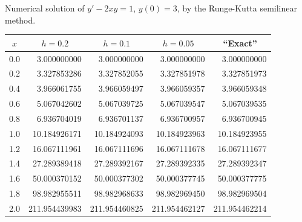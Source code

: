 \begin{examplesolution}
\begin{newtable}
  \label{table:3.3.4} Numerical solution of $y'-2xy=1$, $y(0)=3$, by the Runge-Kutta semilinear
  method.
  \begin{center}
    \begin{tabular}{|c|r|r|r|r|}
      \hline
      \multicolumn{1}{|c|}{$x$} & \multicolumn{1}{|c|}{$h=0.2$} & \multicolumn{1}{|c|}{$h=0.1$} & \multicolumn{1}{|c|}{$h=0.05$} & \multicolumn{1}{|c|}{``Exact''} \\
      \hline
      0.0                       & 3.000000000                   & 3.000000000                   & 3.000000000                    & 3.000000000                     \\
      0.2                       & 3.327853286                   & 3.327852055                   & 3.327851978                    & 3.327851973                     \\
      0.4                       & 3.966061755                   & 3.966059497                   & 3.966059357                    & 3.966059348                     \\
      0.6                       & 5.067042602                   & 5.067039725                   & 5.067039547                    & 5.067039535                     \\
      0.8                       & 6.936704019                   & 6.936701137                   & 6.936700957                    & 6.936700945                     \\
      1.0                       & 10.184926171                  & 10.184924093                  & 10.184923963                   & 10.184923955                    \\
      1.2                       & 16.067111961                  & 16.067111696                  & 16.067111678                   & 16.067111677                    \\
      1.4                       & 27.289389418                  & 27.289392167                  & 27.289392335                   & 27.289392347                    \\
      1.6                       & 50.000370152                  & 50.000377302                  & 50.000377745                   & 50.000377775                    \\
      1.8                       & 98.982955511                  & 98.982968633                  & 98.982969450                   & 98.982969504                    \\
      2.0                       & 211.954439983                 & 211.954460825                 & 211.954462127                  & 211.954462214                   \\
      \hline
    \end{tabular}
  \end{center}
\end{newtable}
\end{examplesolution}

